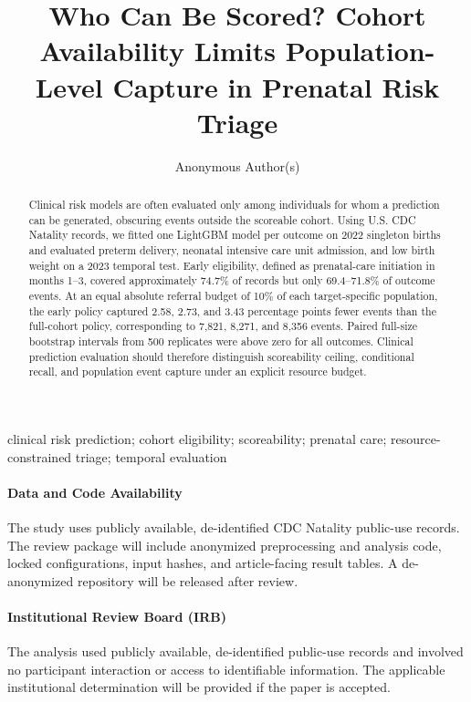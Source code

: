 \documentclass[pmlr,twocolumn,10pt]{jmlr}
\title[Who Can Be Scored?]{Who Can Be Scored? Cohort Availability Limits
Population-Level Capture in Prenatal Risk Triage}
\author{Anonymous Author(s)}
\begin{document}
\maketitle
\linenumbers

\ifmlhdemo\else
\begin{abstract}
Clinical risk models are often evaluated only among individuals for whom a
prediction can be generated, obscuring events outside the scoreable cohort.
Using U.S. CDC Natality records, we fitted one LightGBM model per outcome on
2022 singleton births and evaluated preterm delivery, neonatal intensive care
unit admission, and low birth weight on a 2023 temporal test. Early
eligibility, defined as prenatal-care initiation in months 1--3, covered
approximately 74.7\% of records but only 69.4--71.8\% of outcome events. At
an equal absolute referral budget of 10\% of each target-specific population,
the early policy captured 2.58, 2.73, and 3.43 percentage points fewer events
than the full-cohort policy, corresponding to 7,821, 8,271, and 8,356 events.
Paired full-size bootstrap intervals from 500 replicates were above zero for
all outcomes. Clinical prediction evaluation should therefore distinguish
scoreability ceiling, conditional recall, and population event capture under
an explicit resource budget.
\end{abstract}

\begin{keywords}
clinical risk prediction; cohort eligibility; scoreability; prenatal care;
resource-constrained triage; temporal evaluation
\end{keywords}
\fi

\ifmlhneedsstatements
\paragraph*{Data and Code Availability}
The study uses publicly available, de-identified CDC Natality public-use
records. The review package will include anonymized preprocessing and analysis
code, locked configurations, input hashes, and article-facing result tables.
A de-anonymized repository will be released after review.

\paragraph*{Institutional Review Board (IRB)}
The analysis used publicly available, de-identified public-use records and
involved no participant interaction or access to identifiable information.
The applicable institutional determination will be provided if the paper is
accepted.
\fi
\end{document}

